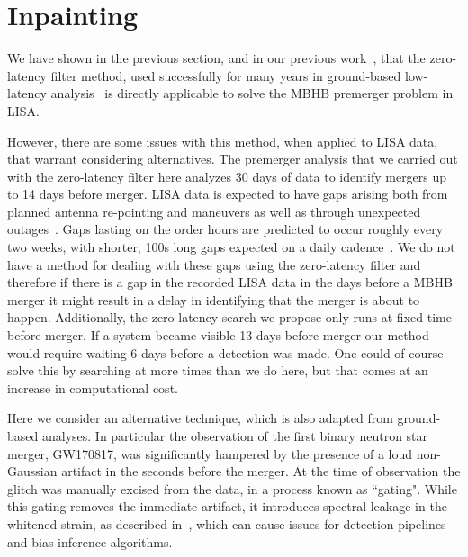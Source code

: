 \documentclass[%
 reprint,
superscriptaddress,
 nofootinbib,
 amsmath,amssymb,
 aps,
 prd,
]{revtex4-2}
\begin{document}
\section{Inpainting}
\label{sec:inpainting}

We have shown in the previous section, and in our previous work~\cite{CabournDavies:2024hea}, that the zero-latency filter method, used successfully for many years in ground-based low-latency analysis~\cite{Tsukada:2017cuf} is directly applicable to
solve the \ac{MBHB} premerger problem in LISA.

However, there are some issues with this method, when applied to LISA data, that warrant considering alternatives.
The premerger analysis that we carried out with the zero-latency filter here analyzes 30 days of data to identify mergers up to 14 days before merger.
LISA data is expected to have gaps arising both from planned antenna re-pointing and maneuvers as well as through unexpected outages~\cite{Colpi:2024xhw}.
Gaps lasting on the order hours are predicted to occur roughly every two weeks, with shorter, 100s long gaps expected on a daily cadence~\cite{Castelli:2024sdb}.
We do not have a method for dealing with these gaps using the zero-latency filter and therefore if there is a gap in the recorded LISA data in the days before a \ac{MBHB} merger it might result in a delay in identifying that the merger is about to happen.
Additionally, the zero-latency search we propose only runs at fixed time before merger. If a system became visible 13 days before merger our method would require waiting 6 days before a detection was made.
One could of course solve this by searching at more times than we do here, but that comes at an increase in computational cost.

Here we consider an alternative technique, which is also adapted from ground-based analyses.
In particular the observation of the first binary neutron star merger, GW170817, was significantly hampered by the presence of a loud non-Gaussian artifact in the seconds before the merger.
At the time of observation the glitch was manually excised from the data, in a process known as ``gating".
While this gating removes the immediate artifact, it introduces spectral leakage in the whitened strain, as described in~\cite{Zackay:2019kkv}, which can cause issues for detection pipelines and bias inference algorithms.
\end{document}
